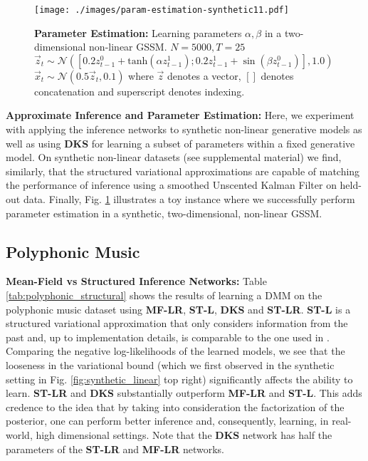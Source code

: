 \documentclass[letterpaper]{article}
\theoremstyle{plain}
\newcommand{\DMM}{DMM\xspace}
\newcommand{\DKS}{\textbf{DKS}\xspace}
\begin{document}
{\begin{figure}[t!]
	\centering
	\texttt{[image: ./images/param-estimation-synthetic11.pdf]}
\caption{\label{fig:synthetic_param_est}
\small 
\textbf{Parameter Estimation: }
Learning parameters $\alpha,\beta$ in a two-dimensional non-linear GSSM. $N=5000, T=25$
$\vec{z}_t\sim\mathcal{N}([0.2z_{t-1}^0+\text{tanh}(\alpha z_{t-1}^1); 0.2z_{t-1}^1+\sin(\beta z_{t-1}^0)] ,1.0)$
$\vec{x}_t\sim\mathcal{N}(0.5\vec{z}_t,0.1)$ where $\vec{z}$ denotes a vector, $[]$ denotes concatenation and superscript denotes
indexing.
}
\end{figure}


\textbf{Approximate Inference and Parameter Estimation: }
Here, we experiment with applying the inference networks to synthetic non-linear generative models
as well as using \DKS for learning a subset of parameters within a fixed generative model.
On synthetic non-linear datasets (see supplemental material)
we find, similarly, that the structured variational approximations 
are capable of matching the performance of inference using a smoothed Unscented Kalman Filter \cite{wan2000unscented} on held-out data. 
Finally, Fig. \ref{fig:synthetic_param_est} illustrates a toy
instance where we successfully perform 
parameter estimation in a synthetic, two-dimensional, non-linear GSSM.

\subsection{Polyphonic Music}
\textbf{Mean-Field vs Structured Inference Networks: }
Table \ref{tab:polyphonic_structural} shows the
results of learning a \DMM on the polyphonic music dataset using 
\textbf{MF-LR}, \textbf{ST-L}, \textbf{\DKS} and \textbf{ST-LR}.
\textbf{ST-L} is a structured variational approximation that only considers
information from the past and, up to implementation details, is comparable
to the one used in \cite{gregor2015draw}.
Comparing the negative log-likelihoods of the learned models, we see
that the looseness in the variational bound (which we first observed in the synthetic
setting in Fig. \ref{fig:synthetic_linear} top right) significantly
affects the ability to learn. \textbf{ST-LR} and \textbf{\DKS}
substantially outperform \textbf{MF-LR} and \textbf{ST-L}.
This adds credence to 
the idea that by taking into consideration the factorization of the posterior, one can perform
better inference and, consequently, learning, in real-world, high
dimensional settings. Note that the \textbf{\DKS} network has half the parameters
of the \textbf{ST-LR} and \textbf{MF-LR} networks.


}
\end{document}
